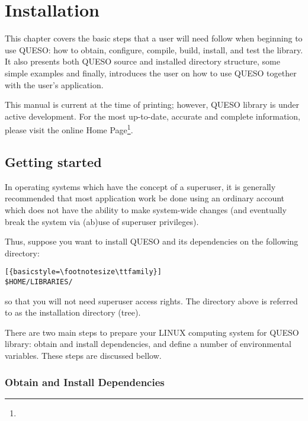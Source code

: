 \chapter{Installation}\label{ch-install}
\thispagestyle{headings}


  
This chapter covers the basic steps that a user will need follow when beginning to use QUESO: 
how to obtain, configure, compile, build, install, and test the library.  It also presents both QUESO source and installed directory structure, some simple examples and finally,  introduces the user on how to use QUESO together with the user's  application.

This manual is current at the time of printing; however, QUESO library  is under active development.
For the most up-to-date, accurate and complete information, please visit the online \Queso{} Home Page\footnote{\Quesoweb}.
        
\section{Getting started}\label{sec:Pre_Queso}

In operating systems which have the concept of a superuser, it is generally recommended that most application work be done 
using an ordinary account which does not have the ability to make system-wide changes (and eventually break the system via 
(ab)use of superuser privileges).

Thus, suppose you want to install QUESO and its dependencies on the following directory:
\begin{lstlisting}[{basicstyle=\footnotesize\ttfamily}]
$HOME/LIBRARIES/
\end{lstlisting}
%
so that you will not need superuser access rights. The directory above is referred to as the \Queso{} installation directory (tree).

There are two main steps to prepare your LINUX computing system  for QUESO library: obtain and install \Queso{} dependencies, and define a number of environmental variables. These steps are discussed bellow.


\subsection{Obtain and Install \Queso{} Dependencies}

